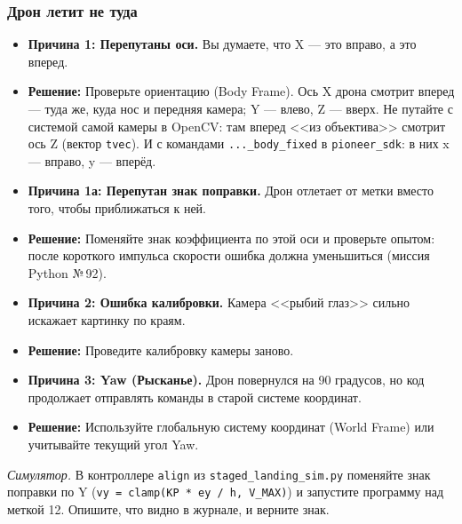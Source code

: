 \subsubsection{Дрон летит не туда}
\begin{itemize}
    \item \textbf{Причина 1: Перепутаны оси.} Вы думаете, что X — это вправо, а это вперед.
    \item \textbf{Решение:} Проверьте ориентацию (Body Frame). Ось X дрона смотрит вперед --- туда же, куда нос и передняя камера; Y --- влево, Z --- вверх. Не путайте с системой самой камеры в OpenCV: там вперед <<из объектива>> смотрит ось Z (вектор \texttt{tvec}). И с командами \texttt{...\_body\_fixed} в \texttt{pioneer\_sdk}: в них x --- вправо, y --- вперёд.

    \item \textbf{Причина 1а: Перепутан знак поправки.} Дрон отлетает от метки вместо того, чтобы приближаться к ней.
    \item \textbf{Решение:} Поменяйте знак коэффициента по этой оси и проверьте опытом: после короткого импульса скорости ошибка должна уменьшиться (миссия Python №\,92).

    \item \textbf{Причина 2: Ошибка калибровки.} Камера <<рыбий глаз>> сильно искажает картинку по краям.
    \item \textbf{Решение:} Проведите калибровку камеры заново.
    
    \item \textbf{Причина 3: Yaw (Рысканье).} Дрон повернулся на 90 градусов, но код продолжает отправлять команды в старой системе координат.
    \item \textbf{Решение:} Используйте глобальную систему координат (World Frame) или учитывайте текущий угол Yaw.
\end{itemize}

\begin{taskbox}
\emph{Симулятор.} В контроллере \texttt{align} из \verb|staged_landing_sim.py| поменяйте знак поправки по Y (\verb|vy = clamp(KP * ey / h, V_MAX)|) и запустите программу над меткой 12. Опишите, что видно в журнале, и верните знак.
\end{taskbox}

